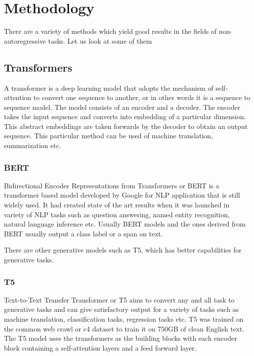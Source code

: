 
\chapter{Methodology} %

\label{Chapter2} %


There are a variety of methods which yield good results in the fields of non-autoregressive tasks. Let us look at some of them
\section{Transformers}
A transformer is a deep learning model that adopts the mechanism of self-attention to convert one sequence to another, or in other words it is a sequence to sequence model. The model consists of an encoder and a decoder. The encoder takes the input sequence and converts into embedding of a particular dimension. This abstract embeddings are taken forwards by the decoder to obtain an output sequence. This particular method can be used of machine translation, summarization etc.\cite{DBLP:journals/corr/VaswaniSPUJGKP17}

\subsection{BERT}
Bidirectional Encoder Representations from Transformers or BERT\cite{DBLP:journals/corr/abs-1810-04805} is a transformer based model developed by Google for NLP application that is still widely used. It had created state of the art results when it was launched in variety of NLP tasks such as question answering, named entity recognition, natural language inference etc. Usually BERT models and the ones derived from BERT usually output a class label or a span on text.

There are other generative models such as T5, which has better capabilities for generative tasks.

\subsection{T5}
Text-to-Text Transfer Transformer or T5\cite{DBLP:journals/corr/abs-1910-10683} aims to convert any and all task to generative tasks and can give satisfactory output for a variety of tasks such as machine translation, classification tasks, regression tasks etc. T5 was trained on the common web crawl or c4 dataset to train it on 750GB of clean English text. The T5 model uses the transformers as the building blocks with each encoder block containing a self-attention layers and a feed forward layer.


